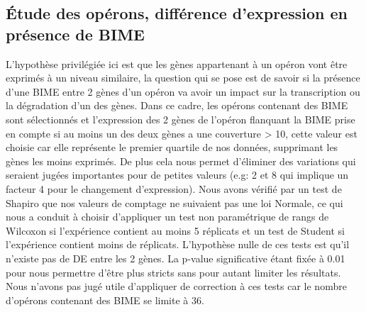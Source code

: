 \documentclass[12pt,a4paper]{report}
\begin{document}
\begin{onehalfspace}
\section*{Étude des opérons, différence d'expression en présence de BIME}
L'hypothèse privilégiée ici est que les gènes appartenant à un opéron vont être exprimés à un niveau similaire, la question qui se pose est de savoir si la présence d'une BIME entre 2 gènes d'un opéron va avoir un impact sur la transcription ou la dégradation d'un des gènes. Dans ce cadre, les opérons contenant des BIME sont sélectionnés et l'expression des 2 gènes de l'opéron flanquant la BIME prise en compte si au moins un des deux gènes a une couverture > 10, cette valeur est choisie car elle représente le premier quartile de nos données, supprimant les gènes les moins exprimés. De plus cela nous permet d'éliminer des variations qui seraient jugées importantes pour de petites valeurs (e.g: 2 et 8 qui implique un facteur 4 pour le changement d'expression). Nous avons vérifié par un test de Shapiro que nos valeurs de comptage ne suivaient pas une loi Normale, ce qui nous a conduit à choisir d'appliquer un test non paramétrique de rangs de Wilcoxon si l'expérience contient au moins 5 réplicats et un test de Student si l'expérience contient moins de réplicats. L'hypothèse nulle de ces tests est qu'il n'existe pas de DE entre les 2 gènes. La p-value significative étant fixée à 0.01 pour nous permettre d'être plus stricts sans pour autant limiter les résultats. Nous n'avons pas jugé utile d'appliquer de correction à ces tests car le nombre d'opérons contenant des BIME se limite à 36.


\end{onehalfspace}
\end{document}
